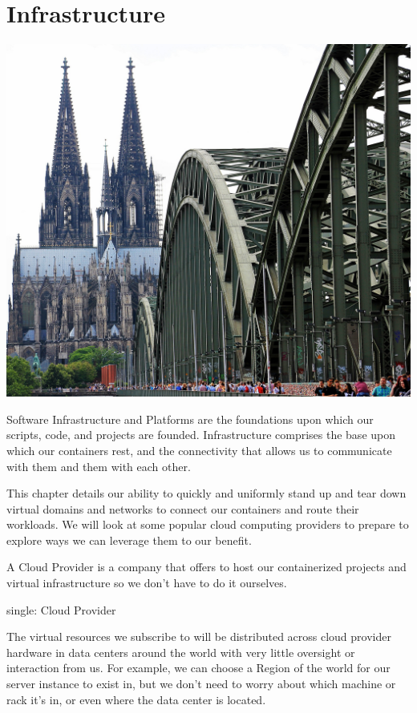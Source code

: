 \chapter{Infrastructure}

\includegraphics{../images/cologne-cathedral-1507854_1920.jpg}

\justify
Software Infrastructure and Platforms are the foundations upon which our
scripts, code, and projects are founded. Infrastructure comprises the
base upon which our containers rest, and the connectivity that allows us
to communicate with them and them with each other.

\justify
This chapter details our ability to quickly and uniformly stand up and
tear down virtual domains and networks to connect our containers and
route their workloads. We will look at some popular cloud computing
providers to prepare to explore ways we can leverage them to our
benefit.

\justify
A Cloud Provider is a company that offers to host our containerized
projects and virtual infrastructure so we don't have to do it ourselves.

single: Cloud Provider

\justify
The virtual resources we subscribe to will be distributed across cloud
provider hardware in data centers around the world with very little
oversight or interaction from us. For example, we can choose a Region of
the world for our server instance to exist in, but we don't need to
worry about which machine or rack it's in, or even where the data center
is located.

